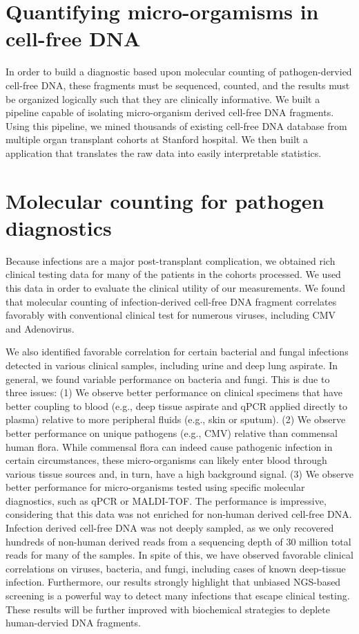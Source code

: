 \section{Quantifying micro-orgamisms in cell-free DNA}

In order to build a diagnostic based upon molecular counting of pathogen-dervied cell-free DNA, these fragments must be sequenced, counted, and the results must be organized logically such that they are clinically informative. We built a pipeline capable of isolating micro-organism derived cell-free DNA fragments. Using this pipeline, we mined thousands of existing cell-free DNA database from multiple organ transplant cohorts at Stanford hospital. We then built a application that translates the raw data into easily interpretable statistics. 

\section{Molecular counting for pathogen diagnostics}

Because infections are a major post-transplant complication, we obtained rich clinical testing data for many of the patients in the cohorts processed. We used this data in order to evaluate the clinical utility of our measurements. We found that molecular counting of infection-derived cell-free DNA fragment correlates favorably with conventional clinical test for numerous viruses, including CMV and Adenovirus.  

We also identified favorable correlation for certain bacterial and fungal infections detected in various clinical samples, including urine and deep lung aspirate. In general, we found variable performance on bacteria and fungi. This is due to three issues: (1) We observe better performance on clinical specimens that have better coupling to blood (e.g., deep tissue aspirate and qPCR applied directly to plasma) relative to more peripheral fluids (e.g., skin or sputum). (2) We observe better performance on unique pathogens (e.g., CMV) relative than commensal human flora. While commensal flora can indeed cause pathogenic infection in certain circumstances, these micro-organisms can likely enter blood through various tissue sources and, in turn, have a high background signal. (3) We observe better performance for micro-organisms tested using specific molecular diagnostics, such as qPCR or MALDI-TOF. The performance is impressive, considering that this data was not enriched for non-human derived cell-free DNA. Infection derived cell-free DNA was not deeply sampled, as we only recovered hundreds of non-human derived reads from a sequencing depth of 30 million total reads for many of the samples. In spite of this, we have observed favorable clinical correlations on viruses, bacteria, and fungi, including cases of known deep-tissue infection. Furthermore, our results strongly highlight that unbiased NGS-based screening is a powerful way to detect many infections that escape clinical testing. These results will be further improved with biochemical strategies to deplete human-dervied DNA fragments.
 

